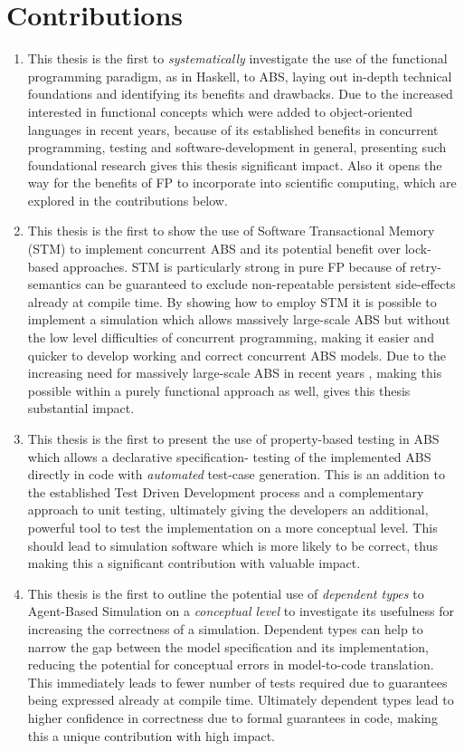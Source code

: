 \section{Contributions}
\begin{enumerate}
	\item This thesis is the first to \textit{systematically} investigate the use of the functional programming paradigm, as in Haskell, to ABS, laying out in-depth technical foundations and identifying its benefits and drawbacks. Due to the increased interested in functional concepts which were added to object-oriented languages in recent years, because of its established benefits in concurrent programming, testing and software-development in general, presenting such foundational research gives this thesis significant impact. Also it opens the way for the benefits of FP to incorporate into scientific computing, which are explored in the contributions below.
	
	\item This thesis is the first to show the use of Software Transactional Memory (STM) to implement concurrent ABS and its potential benefit over lock-based approaches. STM is particularly strong in pure FP because of retry-semantics can be guaranteed to exclude non-repeatable persistent side-effects already at compile time. By showing how to employ STM it is possible to implement a simulation which allows massively large-scale ABS but without the low level difficulties of concurrent programming, making it easier and quicker to develop working and correct concurrent ABS models. Due to the increasing need for massively large-scale ABS in recent years \cite{lysenko_framework_2008}, making this possible within a purely functional approach as well, gives this thesis substantial impact.
	
	\item This thesis is the first to present the use of property-based testing in ABS which allows a declarative specification- testing of the implemented ABS directly in code with \textit{automated} test-case generation. This is an addition to the established Test Driven Development process and a complementary approach to unit testing, ultimately giving the developers an additional, powerful tool to test the implementation on a more conceptual level. This should lead to simulation software which is more likely to be correct, thus making this a significant contribution with valuable impact.

	\item This thesis is the first to outline the potential use of \textit{dependent types} to Agent-Based Simulation on a \textit{conceptual level} to investigate its usefulness for increasing the correctness of a simulation. Dependent types can help to narrow the gap between the model specification and its implementation, reducing the potential for conceptual errors in model-to-code translation. This immediately leads to fewer number of tests required due to guarantees being expressed already at compile time. Ultimately dependent types lead to higher confidence in correctness due to formal guarantees in code, making this a unique contribution with high impact.
\end{enumerate}

